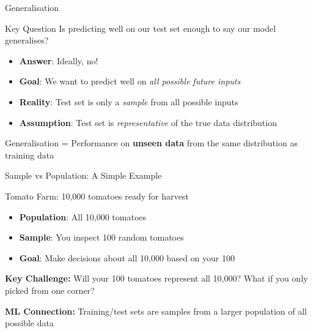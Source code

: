 \documentclass[usenames,dvipsnames]{beamer}
\begin{document}
\begin{frame}{Generalisation}
\begin{alertbox}{Key Question}
Is predicting well on our test set enough to say our model generalises?
\end{alertbox}

\pause
\begin{itemize}
	\item \textbf{Answer}: Ideally, no!
	\item \pause \textbf{Goal}: We want to predict well on \textit{all possible future inputs}
	\item \pause \textbf{Reality}: Test set is only a \textit{sample} from all possible inputs
	\item \pause \textbf{Assumption}: Test set is \textit{representative} of the true data distribution
\end{itemize}

\pause
\begin{keypointsbox}
Generalisation = Performance on \textbf{unseen data} from the same distribution as training data
\end{keypointsbox}



\end{frame}

\begin{frame}{Sample vs Population: A Simple Example}
\begin{examplebox}{Tomato Farm: 10,000 tomatoes ready for harvest}
\begin{itemize}
	\item \textbf{Population}: All 10,000 tomatoes
	\item \pause \textbf{Sample}: You inspect 100 random tomatoes  
	\item \pause \textbf{Goal}: Make decisions about all 10,000 based on your 100
\end{itemize}
\end{examplebox}

\pause
\textbf{Key Challenge:} Will your 100 tomatoes represent all 10,000? What if you only picked from one corner?

\pause
\textbf{ML Connection:} Training/test sets are samples from a larger population of all possible data
\end{frame}
\end{document}
